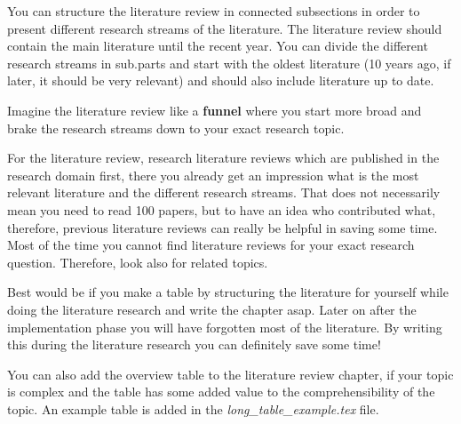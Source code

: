 You can structure the literature review in connected subsections in order to present different research streams of the literature. The literature review should contain the main literature until the recent year. You can divide the different research streams in sub.parts and start with the oldest literature (10 years ago, if later, it should be very relevant) and should also include literature up to date. 

Imagine the literature review like a \textbf{funnel} where you start more broad and brake the research streams down to your exact research topic. 

For the literature review, research literature reviews which are published in the research domain first, there you already get an impression what is the most relevant literature and the different research streams. That does not necessarily mean you need to read 100 papers, but to have an idea who contributed what, therefore, previous literature reviews can really be helpful in saving some time. Most of the time you cannot find literature reviews for your exact research question. Therefore, look also for related topics. 

Best would be if you make a table by structuring the literature for yourself while doing the literature research and write the chapter asap. Later on after the implementation phase you will have forgotten most of the literature. By writing this during the literature research you can definitely save some time!

You can also add the overview table to the literature review chapter, if your topic is complex and the table has some added value to the comprehensibility of the topic. An example table is added in the \textit{long\_table\_example.tex} file.
